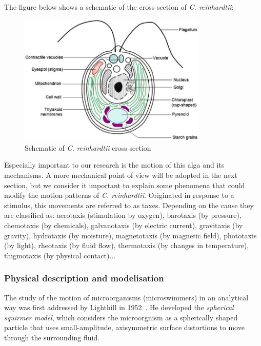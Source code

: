 The figure below shows a schematic of the cross section of \textit{C. reinhardtii}:

\begin{figure}[H]
	\centering
	\includegraphics[width=0.8\textwidth]{archivos/chlamy_illustration.png}
	\caption{Schematic of \textit{C. reinhardtii} cross section~\cite{chlamy_cs}
	}
	\label{chlamy_illustration}
\end{figure}

Especially important to our research is the motion of this alga and its mechanisms. A more mechanical point of view will be adopted in the next section, but we consider it important to explain some phenomena that could modify the motion patterns of \textit{C. reinhardtii}. Originated in response to a stimulus, this movements are referred to as taxes. Depending on the cause they are classified as: aerotaxis (stimulation by oxygen), barotaxis (by pressure), chemotaxis (by chemicals), galvanotaxis (by electric current), gravitaxis (by gravity), hydrotaxis (by moisture), magnetotaxis (by magnetic field), phototaxis (by light), rheotaxis (by fluid flow), thermotaxis (by changes in temperature), thigmotaxis (by physical contact)...

\subsubsection{Physical description and modelisation}

The study of the motion of microorganisms (microswimmers) in an analytical way was first addressed by Lighthill in 1952~\cite{Lighthill}. He developed the \textit{spherical squirmer model}, which considers the microorgnism as a spherically shaped particle that uses small-amplitude, axisymmetric surface distortions to move through the surrounding fluid.

